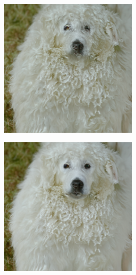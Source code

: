 \documentclass{article}
\begin{document}
\begin{figure}
\begin{subfigure}[b]{0.19\linewidth}
    \end{subfigure}
    \begin{subfigure}[b]{0.19\linewidth}
    \includegraphics[width=\linewidth]{figures/imagenet256/solver_samples/imagenet256_fm_ot_06_20.png}
    \end{subfigure}
    \begin{subfigure}[b]{0.19\linewidth}
    \includegraphics[width=\linewidth]{figures/imagenet256/solver_samples/imagenet256_fm_ot_06_30.png}

\end{subfigure}
\end{figure}
\end{document}
